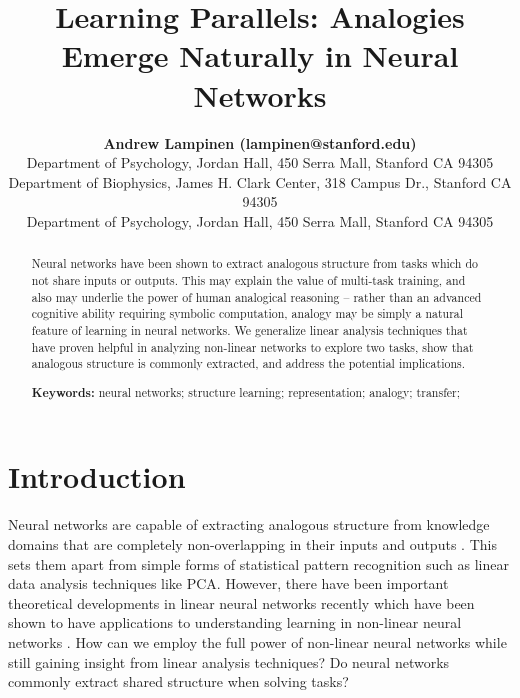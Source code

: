 \documentclass[10pt,letterpaper]{article}
\title{Learning Parallels: Analogies Emerge Naturally in Neural Networks}
\author{{\large \bf Andrew Lampinen (lampinen@stanford.edu)} \\
  Department of Psychology, Jordan Hall, 450 Serra Mall, Stanford CA 94305 
  \AND {\large \bf Shaw Hsu (cshawhsu@stanford.edu)} \\
  Department of Biophysics, James H. Clark Center, 318 Campus Dr., Stanford CA 94305
  \AND {\large \bf James L. McClelland (mcclelland@stanford.edu)} \\
  Department of Psychology, Jordan Hall, 450 Serra Mall, Stanford CA 94305}
\begin{document}
\maketitle


\begin{abstract}
Neural networks have been shown to extract analogous structure from tasks which do not share inputs or outputs. This may explain the value of multi-task training, and also may underlie the power of human analogical reasoning -- rather than an advanced cognitive ability requiring symbolic computation, analogy may be simply a natural feature of learning in neural networks. We generalize linear analysis techniques that have proven helpful in analyzing non-linear networks to explore two tasks, show that analogous structure is commonly extracted, and address the potential implications. 

\textbf{Keywords:} 
neural networks; structure learning; representation; analogy; transfer; 
\end{abstract}


\section{Introduction}
Neural networks are capable of extracting analogous structure from knowledge domains that are completely non-overlapping in their inputs and outputs \citep{Hinton1986,Rogers2008}. This sets them apart from simple forms of statistical pattern recognition \citep{Rogers2008} such as linear data analysis techniques like PCA. However, there have been important theoretical developments in linear neural networks recently which have been shown to have applications to understanding learning in non-linear neural networks \citep{Saxe2013}. How can we employ the full power of non-linear neural networks while still gaining insight from linear analysis techniques? Do neural networks commonly extract shared structure when solving tasks?\par 
\end{document}

